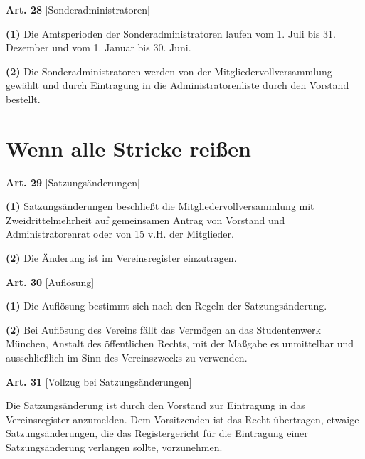 \documentclass[12pt]{article}
\newcommand{\Abschnitt}[1]{\section{#1}}
\newcommand{\Satz}[2]{

\begin{samepage}
{\bf (#1)} #2
\end{samepage}
}
\newenvironment{Artikel}[2]{
\bigskip \centerline{{\bf Art. #1} [#2]}
\nopagebreak
}{
}
\begin{document}
\begin{Artikel}{28}{Sonderadministratoren}

\Satz{1}{Die Amtsperioden der Sonderadministratoren laufen vom 1. Juli bis 31.
Dezember und vom 1. Januar bis 30. Juni.}

\Satz{2}{Die Sonderadministratoren werden von der Mitgliedervollversammlung
ge\-wählt und durch Eintragung in die Administratorenliste durch den Vorstand
bestellt.}

\end{Artikel}


\Abschnitt{Wenn alle Stricke reißen}

\begin{Artikel}{29}{Satzungsänderungen}

\Satz{1}{Satzungsänderungen beschließt die Mitgliedervollversammlung mit
Zweidrittelmehrheit auf gemeinsamen Antrag von Vorstand und Administratorenrat
oder von 15 v.H. der Mitglieder.}

\Satz{2}{Die Änderung ist im Vereinsregister einzutragen.}

\end{Artikel}

\begin{Artikel}{30}{Auflösung}

\Satz{1}{Die Auflösung bestimmt sich nach den Regeln der Satzungsänderung.}

\Satz{2}{Bei Auflösung des Vereins fällt das Vermögen an das Studentenwerk
München, Anstalt des öffentlichen Rechts, mit der Maßgabe es unmittelbar und
ausschließlich im Sinn des Vereinszwecks zu verwenden.}

\end{Artikel}

\begin{Artikel}{31}{Vollzug bei Satzungsänderungen}

Die Satzungsänderung ist durch den Vorstand zur Eintragung in das
Vereinsregister anzumelden. Dem Vorsitzenden ist das Recht übertragen, etwaige
Satzungsänderungen, die das Registergericht für die Eintragung einer
Satzungsänderung verlangen sollte, vorzunehmen.

\end{Artikel}
\end{document}
